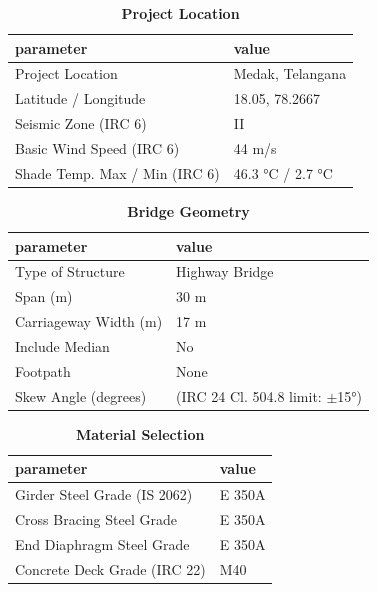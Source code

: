 \documentclass[12pt,a4paper]{report}
\numberwithin{table}{chapter}
\numberwithin{figure}{chapter}
\begin{document}
\begin{table}[H]
\caption{\textbf{Project Location}}
\label{subsec:project-location}
\begin{tabular}{|L{5.5cm}|L{10.0cm}|}
\hline
\textbf{parameter} & \textbf{value} \\
\hline
\textnormal{Project Location} & Medak, Telangana \\
\hline
\textnormal{Latitude / Longitude} & 18.05, 78.2667 \\
\hline
\textnormal{Seismic Zone (IRC 6)} & II \\
\hline
\textnormal{Basic Wind Speed (IRC 6)} & 44 m/s \\
\hline
\textnormal{Shade Temp. Max / Min (IRC 6)} & 46.3 °C / 2.7 °C \\
\hline
\end{tabular}
\vspace{0.4cm}
\end{table}

\begin{table}[H]
\caption{\textbf{Bridge Geometry}}
\label{subsec:bridge-geometry}
\begin{tabular}{|L{5.5cm}|L{10.0cm}|}
\hline
\textbf{parameter} & \textbf{value} \\
\hline
\textnormal{Type of Structure} & Highway Bridge \\
\hline
\textnormal{Span (m)} & 30 m \\
\hline
\textnormal{Carriageway Width (m)} & 17 m \\
\hline
\textnormal{Include Median} & No \\
\hline
\textnormal{Footpath} & None \\
\hline
\textnormal{Skew Angle (degrees)} &  (IRC 24 Cl. 504.8 limit: $\pm$15°) \\
\hline
\end{tabular}
\end{table}
\vspace{0.4cm}

\begin{table}[H]
\caption{\textbf{Material Selection}}
\label{subsec:material}
\begin{tabular}{|L{5.5cm}|L{10.0cm}|}
\hline
\textbf{parameter} & \textbf{value} \\
\hline
\textnormal{Girder Steel Grade (IS 2062)} & E 350A \\
\hline
\textnormal{Cross Bracing Steel Grade} & E 350A \\
\hline
\textnormal{End Diaphragm Steel Grade} & E 350A \\
\hline
\textnormal{Concrete Deck Grade (IRC 22)} & M40 \\
\hline
\end{tabular}
\end{table}
\vspace{0.4cm}
\end{document}
